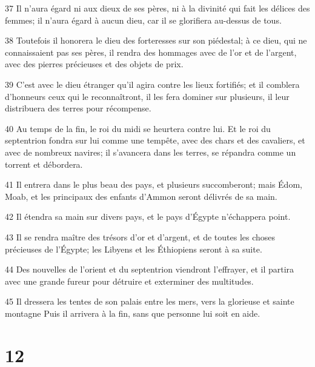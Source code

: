 \par 37 Il n'aura égard ni aux dieux de ses pères, ni à la divinité qui fait les délices des femmes; il n'aura égard à aucun dieu, car il se glorifiera au-dessus de tous.
\par 38 Toutefois il honorera le dieu des forteresses sur son piédestal; à ce dieu, qui ne connaissaient pas ses pères, il rendra des hommages avec de l'or et de l'argent, avec des pierres précieuses et des objets de prix.
\par 39 C'est avec le dieu étranger qu'il agira contre les lieux fortifiés; et il comblera d'honneurs ceux qui le reconnaîtront, il les fera dominer sur plusieurs, il leur distribuera des terres pour récompense.
\par 40 Au temps de la fin, le roi du midi se heurtera contre lui. Et le roi du septentrion fondra sur lui comme une tempête, avec des chars et des cavaliers, et avec de nombreux navires; il s'avancera dans les terres, se répandra comme un torrent et débordera.
\par 41 Il entrera dans le plus beau des pays, et plusieurs succomberont; mais Édom, Moab, et les principaux des enfants d'Ammon seront délivrés de sa main.
\par 42 Il étendra sa main sur divers pays, et le pays d'Égypte n'échappera point.
\par 43 Il se rendra maître des trésors d'or et d'argent, et de toutes les choses précieuses de l'Égypte; les Libyens et les Éthiopiens seront à sa suite.
\par 44 Des nouvelles de l'orient et du septentrion viendront l'effrayer, et il partira avec une grande fureur pour détruire et exterminer des multitudes.
\par 45 Il dressera les tentes de son palais entre les mers, vers la glorieuse et sainte montagne Puis il arrivera à la fin, sans que personne lui soit en aide.

\chapter{12}

